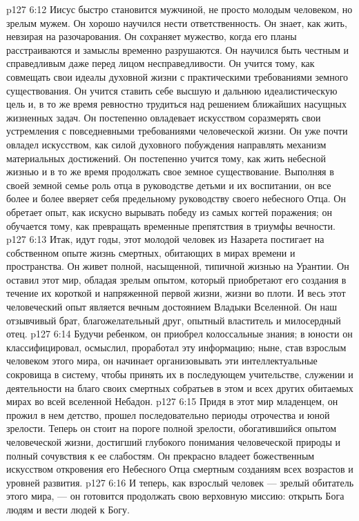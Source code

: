 \vs p127 6:12 \pc Иисус быстро становится мужчиной, не просто молодым человеком, но зрелым мужем. Он хорошо научился нести ответственность. Он знает, как жить, невзирая на разочарования. Он сохраняет мужество, когда его планы расстраиваются и замыслы временно разрушаются. Он научился быть честным и справедливым даже перед лицом несправедливости. Он учится тому, как совмещать свои идеалы духовной жизни с практическими требованиями земного существования. Он учится ставить себе высшую и дальнюю идеалистическую цель и, в то же время ревностно трудиться над решением ближайших насущных жизненных задач. Он постепенно овладевает искусством соразмерять свои устремления с повседневными требованиями человеческой жизни. Он уже почти овладел искусством, как силой духовного побуждения направлять механизм материальных достижений. Он постепенно учится тому, как жить небесной жизнью и в то же время продолжать свое земное существование. Выполняя в своей земной семье роль отца в руководстве детьми и их воспитании, он все более и более вверяет себя предельному руководству своего небесного Отца. Он обретает опыт, как искусно вырывать победу из самых когтей поражения; он обучается тому, как превращать временные препятствия в триумфы вечности.
\vs p127 6:13 \pc Итак, идут годы, этот молодой человек из Назарета постигает на собственном опыте жизнь смертных, обитающих в мирах времени и пространства. Он живет полной, насыщенной, типичной жизнью на Урантии. Он оставил этот мир, обладая зрелым опытом, который приобретают его создания в течение их короткой и напряженной первой жизни, жизни во плоти. И весь этот человеческий опыт является вечным достоянием Владыки Вселенной. Он наш отзывчивый брат, благожелательный друг, опытный властитель и милосердный отец.
\vs p127 6:14 Будучи ребенком, он приобрел колоссальные знания; в юности он классифицировал, осмыслил, проработал эту информацию; ныне, став взрослым человеком этого мира, он начинает организовывать эти интеллектуальные сокровища в систему, чтобы принять их в последующем учительстве, служении и деятельности на благо своих смертных собратьев в этом и всех других обитаемых мирах во всей вселенной Небадон.
\vs p127 6:15 Придя в этот мир младенцем, он прожил в нем детство, прошел последовательно периоды отрочества и юной зрелости. Теперь он стоит на пороге полной зрелости, обогатившийся опытом человеческой жизни, достигший глубокого понимания человеческой природы и полный сочувствия к ее слабостям. Он прекрасно владеет божественным искусством откровения его Небесного Отца смертным созданиям всех возрастов и уровней развития.
\vs p127 6:16 И теперь, как взрослый человек --- зрелый обитатель этого мира, --- он готовится продолжать свою верховную миссию: открыть Бога людям и вести людей к Богу.
